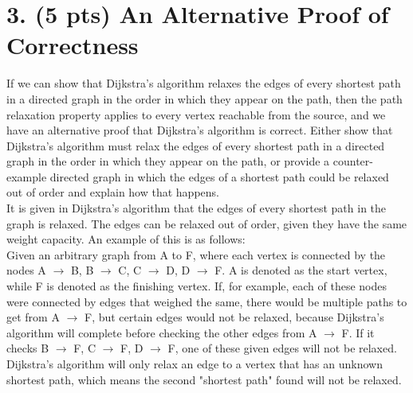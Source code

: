\documentclass[12pt]{article}
\begin{document}
\section*{3. (5 pts) An Alternative Proof of Correctness}
If we can show that Dijkstra's algorithm relaxes the edges of every shortest path in a directed graph in the order in which they appear on the path, then the path relaxation property applies to every vertex reachable from the source, and we have an alternative proof that Dijkstra's algorithm is correct. Either show that Dijkstra's algorithm must relax the edges of every shortest path in a directed graph in the order in which they appear on the path, or provide a counter-example directed graph in which the edges of a shortest path could be relaxed out of order and explain how that happens. \\
\linebreak
It is given in Dijkstra's algorithm that the edges of every shortest path in the graph is relaxed. The edges can be relaxed out of order, given they have the same weight capacity. An example of this is as follows: \\
Given an arbitrary graph from A to F, where each vertex is connected by the nodes A $\rightarrow$ B, B $\rightarrow$ C, C $\rightarrow$ D, D $\rightarrow$ F. A is denoted as the start vertex, while F is denoted as the finishing vertex. If, for example, each of these nodes were connected by edges that weighed the same,  there would be multiple paths to get from A $\rightarrow$ F, but certain edges would not be relaxed, because Dijkstra's algorithm will complete before checking the other edges from A $\rightarrow$ F. If it checks B $\rightarrow$ F, C $\rightarrow$ F, D $\rightarrow$ F, one of these given edges will not be relaxed.  Dijkstra's algorithm will only relax an edge to a vertex that has an unknown shortest path, which means the second "shortest path" found will not be relaxed. \\
\end{document}
